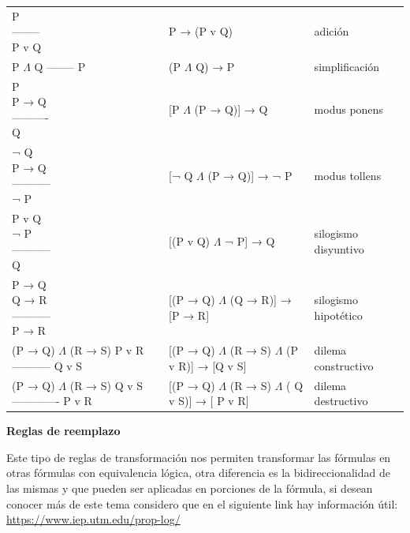 \documentclass[11pt,fleqn]{book} %
\begin{document}
\clearpage
\begin{tabular}{|l|l|l|}
\hline
	\thead{Regla de inferencia}	& \thead{Tautología} & \thead{Nombre}\\
\hline
	\makecell[l]{P \\-------- \\P v Q}  & P → (P v Q) & adición\\
\hline
	\makecell[l]{P $\Lambda$ Q\\--------\\P} & (P $\Lambda$ Q) → P & simplificación\\
\hline
	\makecell[l]{P \\P → Q\\----------\\Q} & [P $\Lambda$ (P → Q)] → Q & modus ponens\\
\hline
	\makecell[l]{¬ Q \\P → Q\\-----------\\¬ P} & [¬ Q $\Lambda$ (P → Q)] → ¬ P & modus tollens\\
\hline
	\makecell[l]{P v Q \\¬ P\\-----------\\Q} & [(P v Q) $\Lambda$ ¬ P] → Q & silogismo disyuntivo\\
\hline
	\makecell[l]{P → Q \\Q → R\\-----------\\P → R} & [(P → Q) $\Lambda$ (Q → R)] → [P → R] & silogismo hipotético\\
\hline
	\makecell[l]{(P → Q) $\Lambda$ (R → S) \\P v R\\-----------\\Q v S} & [(P → Q) $\Lambda$ (R → S) $\Lambda$ (P v R)] → [Q v S] & dilema constructivo\\
\hline
	\makecell[l]{(P → Q) $\Lambda$ (R → S) \\Q v S\\-------------\\P v R} & [(P → Q) $\Lambda$  (R → S) $\Lambda$  ( Q v S)] → [ P v R] & dilema destructivo\\
\hline
\end{tabular}

\clearpage
\textbf{Reglas de reemplazo} 

Este tipo de reglas de transformación nos permiten transformar las fórmulas en otras fórmulas con equivalencia lógica, otra diferencia es la bidireccionalidad de las mismas y que pueden ser aplicadas en porciones de la fórmula, si desean conocer más de este tema considero que en el siguiente link hay información útil: \url{https://www.iep.utm.edu/prop-log/}
\end{document}
